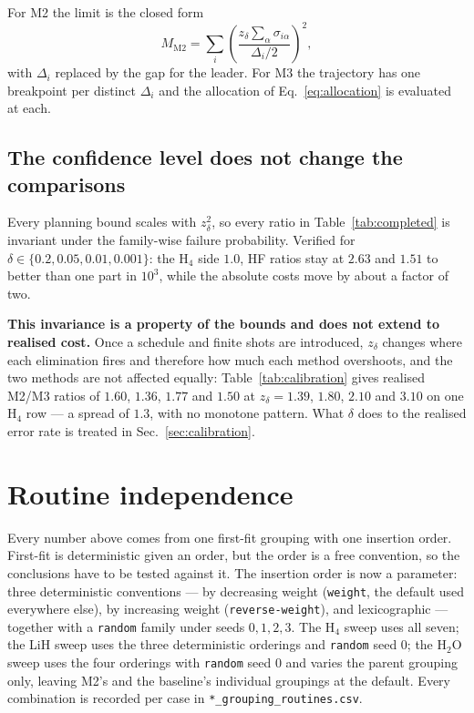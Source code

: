 \documentclass[10pt]{article}
\begin{document}
For M2 the limit is the closed form
\begin{equation}
  M_{\text{M2}}
  =\sum_i\left(\frac{z_\delta\sum_\alpha\sigma_{i\alpha}}{\Delta_i/2}\right)^{2},
  \label{eq:m2-exact}
\end{equation}
with $\Delta_i$ replaced by the gap for the leader. For M3 the trajectory has one
breakpoint per distinct $\Delta_i$ and the allocation of Eq.~\eqref{eq:allocation}
is evaluated at each.

\subsection{The confidence level does not change the comparisons}

Every planning bound scales with $z_\delta^2$, so every ratio in
Table~\ref{tab:completed} is invariant under the family-wise failure probability.
Verified for $\delta\in\{0.2,0.05,0.01,0.001\}$: the H$_4$ side $1.0$, HF ratios stay
at $2.63$ and $1.51$ to better than one part in $10^3$, while the absolute costs
move by about a factor of two.

\textbf{This invariance is a property of the bounds and does not extend to
realised cost.} Once a schedule and finite shots are introduced, $z_\delta$ changes
where each elimination fires and therefore how much each method overshoots, and
the two methods are not affected equally: Table~\ref{tab:calibration} gives
realised M2/M3 ratios of $1.60$, $1.36$, $1.77$ and $1.50$ at
$z_\delta=1.39$, $1.80$, $2.10$ and $3.10$ on one H$_4$ row --- a spread of $1.3$,
with no monotone pattern. What $\delta$ does to the realised error rate is treated
in Sec.~\ref{sec:calibration}.

\section{Routine independence}
\label{sec:routines}

Every number above comes from one first-fit grouping with one insertion order.
First-fit is deterministic given an order, but the order is a free convention, so
the conclusions have to be tested against it. The insertion order is now a
parameter: three deterministic conventions --- by decreasing weight
(\texttt{weight}, the default used everywhere else), by increasing weight
(\texttt{reverse-weight}), and lexicographic --- together with a
\texttt{random} family under seeds $0,1,2,3$. The H$_4$ sweep uses all seven; the
LiH sweep uses the three deterministic orderings and \texttt{random} seed $0$; the
H$_2$O sweep uses the four orderings with \texttt{random} seed $0$ and varies the
parent grouping only, leaving M2's and the baseline's individual groupings at the
default. Every combination is recorded per case in
\texttt{*\_grouping\_routines.csv}.
\end{document}
